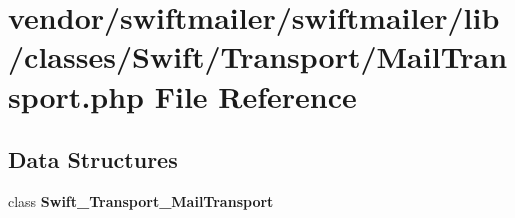 \section{vendor/swiftmailer/swiftmailer/lib/classes/\+Swift/\+Transport/\+Mail\+Transport.php File Reference}
\label{_transport_2_mail_transport_8php}
\subsection*{Data Structures}
\begin{DoxyCompactItemize}
\item 
class {\bf Swift\+\_\+\+Transport\+\_\+\+Mail\+Transport}
\end{DoxyCompactItemize}
